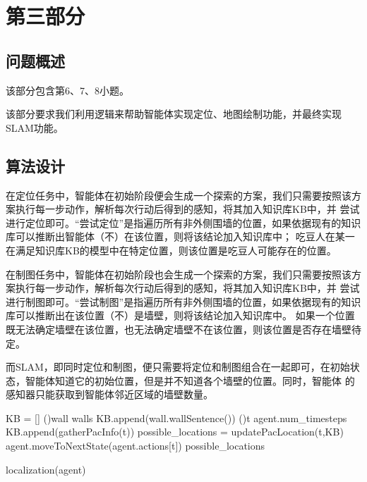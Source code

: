 \chapter{第三部分}
\section{问题概述}
%
%
%
%
%
%
该部分包含第6、7、8小题。

该部分要求我们利用逻辑来帮助智能体实现定位、地图绘制功能，并最终实现SLAM功能。
\section{算法设计}
%
%
在定位任务中，智能体在初始阶段便会生成一个探索的方案，我们只需要按照该方案执行每一步动作，解析每次行动后得到的感知，将其加入知识库KB中，并
尝试进行定位即可。“尝试定位”是指遍历所有非外侧围墙的位置，如果依据现有的知识库可以推断出智能体（不）在该位置，则将该结论加入知识库中；
吃豆人在某一在满足知识库KB的模型中在特定位置，则该位置是吃豆人可能存在的位置。

在制图任务中，智能体在初始阶段也会生成一个探索的方案，我们只需要按照该方案执行每一步动作，解析每次行动后得到的感知，将其加入知识库KB中，并
尝试进行制图即可。“尝试制图”是指遍历所有非外侧围墙的位置，如果依据现有的知识库可以推断出在该位置（不）是墙壁，则将该结论加入知识库中。
如果一个位置既无法确定墙壁在该位置，也无法确定墙壁不在该位置，则该位置是否存在墙壁待定。

而SLAM，即同时定位和制图，便只需要将定位和制图组合在一起即可，在初始状态，智能体知道它的初始位置，但是并不知道各个墙壁的位置。同时，智能体
的感知器只能获取到智能体邻近区域的墙壁数量。

\begin{algorithm}[H]
    KB = []\;
    \ForAll(){wall \in walls}
    {KB.append(wall.wallSentence())}
    \For(){t \in agent.num\_timesteps}
    {
        KB.append(gatherPacInfo(t))\;
        possible\_locations = updatePacLocation(t,KB)\;
        agent.moveToNextState(agent.actions[t])\;
        \yield possible\_locations\;
    }
    \caption{localization(agent)}
\end{algorithm}


